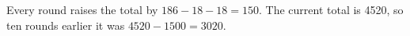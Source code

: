 Every round raises the total by $ 186-18-18=150 $. The current total is 4520, so ten rounds earlier it was $ 4520-1500=\boxed{3020}$.
